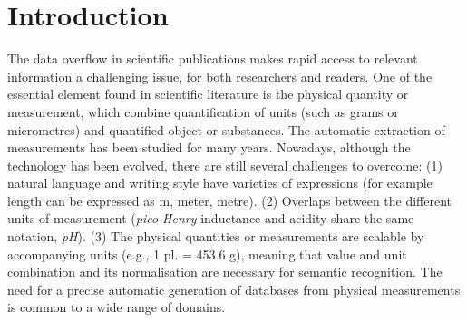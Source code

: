 \documentclass[sigconf]{acmart}
\begin{document}


\maketitle

\section{Introduction}

The data overflow in scientific publications makes rapid access to relevant information a challenging issue, for both researchers and readers. 
One of the essential element found in scientific literature is the physical quantity or measurement, which combine quantification of units (such as grams or micrometres) and quantified object or substances. The automatic extraction of measurements has been studied for many years. Nowadays, although the technology has been evolved, there are still several challenges to overcome: (1) natural language and writing style have varieties of expressions (for example length can be expressed as m, meter, metre). (2) Overlaps between the different units of measurement (\textit{pico Henry} inductance and acidity share the same notation, \textit{pH}). (3) The physical quantities or measurements are scalable by accompanying units (e.g., 1 pl. = 453.6 g), meaning that value and unit combination and its normalisation are necessary for semantic recognition. The need for a precise automatic generation of databases from physical measurements is common to a wide range of domains. 
\end{document}

